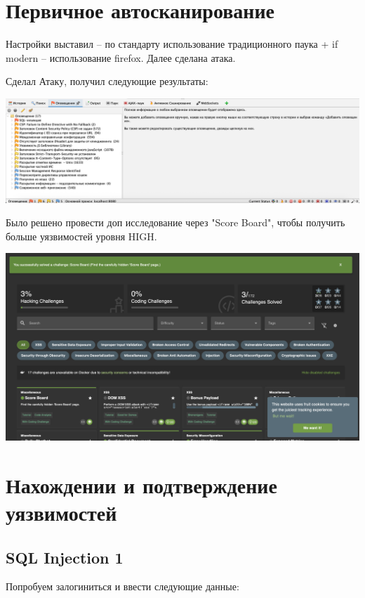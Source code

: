 \documentclass{article}
\begin{document}
\section{Первичное автосканирование}

Настройки выставил -- по стандарту использование традиционного паука + 
if modern -- использование firefox. Далее сделана атака.

Сделал Атаку, получил следующие результаты:
\begin{center}
  \includegraphics[width=.9\textwidth]{scan}
\end{center}

Было решено провести доп исследование через "Score
Board", чтобы получить больше уязвимостей уровня HIGH.

\begin{center}
  \includegraphics[width=.9\textwidth]{br}
\end{center}

\section{Нахождении и подтверждение уязвимостей}

\subsection{SQL Injection 1}
Попробуем залогиниться и ввести следующие данные:
\end{document}
